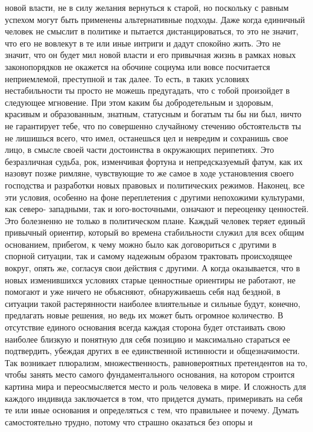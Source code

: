 новой власти, не в силу желания вернуться к старой, но поскольку с равным
успехом могут быть применены альтернативные подходы. Даже когда единичный
человек не смыслит в политике и пытается дистанцироваться, то это не значит, что
его не вовлекут в те или иные интриги и дадут спокойно жить. Это не значит, что
он будет мил новой власти и его привычная жизнь в рамках новых законопорядков не
окажется на обочине социума или вовсе посчитается неприемлемой, преступной и так
далее. То есть, в таких условиях нестабильности ты просто не можешь предугадать,
что с тобой произойдет в следующее мгновение. При этом каким бы добродетельным и
здоровым, красивым и образованным, знатным, статусным и богатым ты бы ни был,
ничто не гарантирует тебе, что по совершенно случайному стечению обстоятельств
ты не лишишься всего, что имел, останешься цел и невредим и сохранишь свое лицо,
в смысле своей части достоинства в окружающих перипетиях. Это безразличная
судьба, рок, изменчивая фортуна и непредсказуемый фатум, как их назовут позже
римляне, чувствующие то же самое в ходе установления своего господства и
разработки новых правовых и политических режимов. Наконец, все эти условия,
особенно на фоне переплетения с другими непохожими культурами, как северо-
западными, так и юго-восточными, означают и переоценку ценностей. Это болезненно
не только в политическом плане. Каждый человек теряет единый привычный ориентир,
который во времена стабильности служил для всех общим основанием, прибегом, к
чему можно было как договориться с другими в спорной ситуации, так и самому
надежным образом трактовать происходящее вокруг, опять же, согласуя свои
действия с другими. А когда оказывается, что в новых изменившихся условиях
старые ценностные ориентиры не работают, не помогают и уже ничего не объясняют,
обнаруживаешь себя над бездной, в ситуации такой растерянности наиболее
влиятельные и сильные будут, конечно, предлагать новые решения, но ведь их может
быть огромное количество. В отсутствие единого основания всегда каждая сторона
будет отстаивать свою наиболее близкую и понятную для себя позицию и максимально
стараться ее подтвердить, убеждая других в ее единственной истинности и
общезначимости. 
Так возникает плюрализм, множественность, равновероятных
претендентов на то, чтобы занять место самого фундаментального основания, на
котором строится картина мира и переосмысляется место и роль человека в мире. И
сложность для каждого индивида заключается в том, что придется думать,
примеривать на себя те или иные основания и определяться с тем, что правильнее и
почему. Думать самостоятельно трудно, потому что страшно оказаться без опоры и
